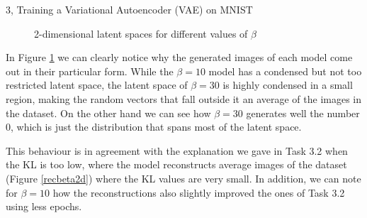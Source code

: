 \begin{task}{3, Training a Variational Autoencoder (VAE) on MNIST}
\begin{figure}[H]
    \centering
    \caption{2-dimensional latent spaces for different values of \(\beta\)}
    \label{latentbeta2d}
\end{figure}

In Figure \ref{latentbeta2d} we can clearly notice why the generated images of each model come out in their particular form. While the \(\beta = 10\) model has a condensed but not too restricted latent space, the latent space of \(\beta = 30\) is highly condensed in a small region, making the random vectors that fall outside it an average of the images in the dataset. On the other hand we can see how \(\beta = 30\) generates well the number 0, which is just the distribution that spans most of the latent space. 

This behaviour is in agreement with the explanation we gave in Task 3.2 when the KL is too low, where the model reconstructs average images of the dataset (Figure \ref{recbeta2d}) where the KL values are very small. In addition, we can note for \(\beta = 10\) how the reconstructions also slightly improved the ones of Task 3.2 using less epochs.


\end{task}
